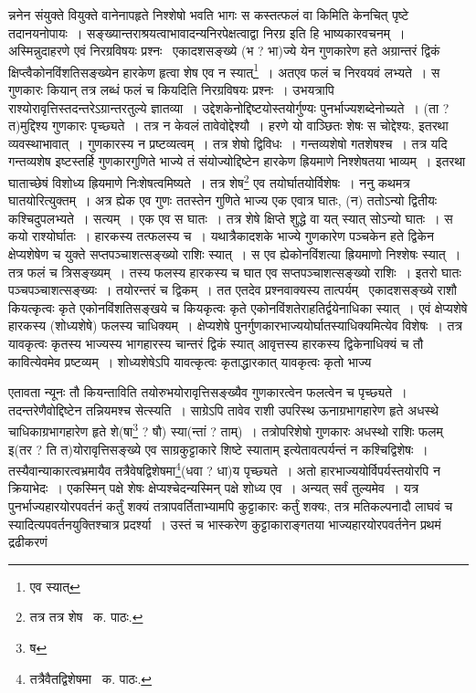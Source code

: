 \documentclass[11pt, openany]{book}
\begin{document}
\noindent न्ननेन संयुक्ते वियुक्ते वानेनापहृते निश्शेषो भवति भागः स कस्तत्फलं वा किमिति केनचित् पृष्टे तदानयनोपायः~। {\qt सङ्ख्यान्तराश्रयत्वाभावादन्यनिरपेक्षत्वाद्वा निरग्र} इति हि भाष्यकारवचनम्~। अस्मिन्नुदाहरणे एवं निरग्रविषयः प्रश्नः \textendash\ एकादशसङ्ख्ये (भ ? भा)ज्ये येन गुणकारेण हते अग्रान्तरं द्विकं क्षिप्त्वैकोनविंशतिसङ्ख्येन हारकेण हृत्वा शेष एव न स्यात्\renewcommand{\thefootnote}{२}\footnote{एव स्यात्}~। अतएव फलं च निरवयवं लभ्यते~। स गुणकारः कियान् तत्र लब्धं फलं च कियदिति निरग्रविषयः प्रश्नः~। उभयत्रापि राश्योरावृत्तिस्तदन्तरेऽग्रान्तरतुल्ये ज्ञातव्या~। उद्देशकेनोद्दिष्टयोस्तयोर्गुण्यः पुनर्भाज्यशब्देनोच्यते~। (ता ? त)मुद्दिश्य गुणकारः पृच्छ्यते~। तत्र न केवलं तावेवोद्देश्यौ~। हरणे यो वाञ्छितः शेषः स चोद्देश्यः, इतरथा व्यवस्थाभावात्~। गुणकारस्य न प्रष्टव्यत्वम्~। तत्र शेषो द्विविधः~। गन्तव्यशेषो गतशेषश्च~। तत्र यदि गन्तव्यशेष इष्टस्तर्हि गुणकारगुणिते भाज्ये तं संयोज्योद्दिष्टेन हारकेण ह्रियमाणे निश्शेषतया भाव्यम्~। इतरथा घाताच्छेषं विशोध्य ह्रियमाणे
निःशेषत्वमिष्यते~। तत्र शेष\renewcommand{\thefootnote}{२}\footnote{तत्र तत्र शेष \textendash\ क. पाठः.} एव तयोर्घातयोर्विशेषः~। ननु कथमत्र घातयोरित्युक्तम्~। अत्र ह्येक एव गुणः ततस्तेन गुणिते भाज्य एक एवात्र
घातः, (न) ततोऽन्यो द्वितीयः कश्चिदुपलभ्यते~। सत्यम्~। एक एव स घातः~। तत्र शेषे क्षिप्ते शुद्धे वा यत् स्यात् सोऽन्यो घातः~। स कयो
राश्योर्घातः~। हारकस्य तत्फलस्य च~। यथात्रैकादशके भाज्ये गुणकारेण पञ्चकेन हते द्विकेन क्षेप्यशेषेण च युक्ते सप्तपञ्चाशत्सङ्ख्यो राशिः स्यात्~। स एव ह्येकोनविंशत्या ह्रियमाणो निश्शेषः स्यात्~। तत्र फलं च त्रिसङ्ख्यम्~। तस्य फलस्य हारकस्य च घात एव सप्तपञ्चाशत्सङ्ख्यो राशिः~। इतरो घातः पञ्चपञ्चाशत्सङ्ख्यः~। तयोरन्तरं च द्विकम्~। तत एतदेव प्रश्नवाक्यस्य तात्पर्यम् \textendash\ एकादशसङ्ख्ये राशौ कियत्कृत्वः कृते एकोनविंशतिसङ्खये च कियकृत्वः कृते एकोनविंशतेराहतिर्द्वयेनाधिका स्यात्~। एवं क्षेप्यशेषे हारकस्य (शोध्यशेषे) फलस्य चाधिक्यम्~। क्षेप्यशेषे पुनर्गुणकारभाज्ययोर्घातस्याधिक्यमित्येव विशेषः~। तत्र यावकृत्वः कृतस्य भाज्यस्य भागहारस्य चान्तरं द्विकं स्यात् आवृत्तस्य हारकस्य द्विकेनाधिक्यं च तौ कावित्येवमेव प्रष्टव्यम्~। शोध्यशेषेऽपि यावत्कृत्वः कृताद्धारकात् यावकृत्वः कृतो भाज्य

\newpage

\noindent एतावता न्यूनः तौ कियन्ताविति तयोरुभयोरावृत्तिसङ्ख्यैव गुणकारत्वेन फलत्वेन च पृच्छ्यते~। तदन्तरेणैवोद्दिष्टेन तन्नियमश्च सेत्स्यति~। साग्रेऽपि तावेव राशी उपरिस्थ ऊनाग्रभागहारेण हृते अधस्थे चाधिकाग्रभागहारेण हृते शे(षा\renewcommand{\thefootnote}{१}\footnote{ष} ? षौ) स्या(न्तां ? ताम्)~। तत्रोपरिशेषो गुणकारः अधस्थो राशिः फलम् इ(तर ? ति त)योरावृत्तिसङ्ख्ये एव साग्रकुट्टाकारे शिष्टे स्याताम् इत्येतावत्पर्यन्तं न कश्चिद्विशेषः~। तस्यैवान्याकारत्वभ्रमायैव तत्रैवेषद्विशेषमा\renewcommand{\thefootnote}{१}\footnote{तत्रैवैतद्विशेषमा \textendash\ क. पाठः.}(धवा ? धा)य पृच्छ्यते~। अतो हारभाज्ययोर्विपर्यस्तयोरपि न क्रियाभेदः~। एकस्मिन् पक्षे शेषः क्षेप्यश्चेदन्यस्मिन् पक्षे शोध्य एव~। अन्यत् सर्वं तुल्यमेव~। यत्र पुनर्भाज्यहारयोरपवर्तनं कर्तुं शक्यं तत्रापवर्तिताभ्यामपि कुट्टाकारः कर्तुं शक्यः, तत्र मतिकल्पनादौ लाघवं च स्यादित्यपवर्तनयुक्तिश्चात्र प्रदर्श्या~। उस्तं च भास्करेण कुट्टाकाराङ्गतया भाज्यहारयोरपवर्तनेन प्रथमं द्रढीकरणं\textendash
\end{document}
